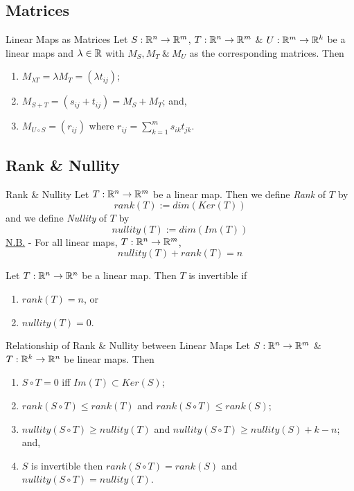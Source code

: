 \documentclass[11pt,a4paper]{article}
\begin{document}
\subsection{Matrices}

\subtitle{Definition 5.09 - }{Linear Maps as Matrices}
Let $S : \mathbb{R}^n \to \mathbb{R}^m$, $T : \mathbb{R}^n \to \mathbb{R}^m$ \& $U : \mathbb{R}^m \to \mathbb{R}^k$ be a linear maps and $\lambda \in \mathbb{R}$ with $M_S, M_T\ \&\ M_U$ as the corresponding matrices. Then
\begin{enumerate}[label=\roman*)]
  \item $M_{\lambda T} = \lambda M_T = (\lambda t_{ij})$;
  \item $M_{S + T} = (s_{ij} + t_{ij}) = M_S + M_T$; and,
  \item $M_{U \circ S} = (r_{ij})$ where $r_{ij} = \sum_{k=1}^m s_{ik}t_{jk}$.
\end{enumerate}

\subsection{Rank \& Nullity}

\subtitle{Defintion 5.10 - }{Rank \& Nullity}
Let $T : \mathbb{R}^n \to \mathbb{R}^m$ be a linear map. Then we define \textit{Rank} of $T$ by $$rank(T) := dim(Ker(T))$$
and we define \textit{Nullity} of $T$ by $$nullity(T) := dim(Im(T))$$
\underline{N.B.} - For all linear maps, $T : \mathbb{R}^n \to \mathbb{R}^m$, $$nullity(T) + rank(T) = n$$

\subtitle{Remark 5.11}{}
Let $T : \mathbb{R}^n \to \mathbb{R}^n$ be a linear map. Then $T$ is invertible if
\begin{enumerate}[label=\roman*)]
  \item $rank(T) = n$, or
  \item $nullity(T) = 0$.
\end{enumerate}

\subtitle{Theorem 5.12 - }{Relationship of Rank \& Nullity between Linear Maps}
Let $S : \mathbb{R}^n \to \mathbb{R}^m$ \& $T : \mathbb{R}^k \to \mathbb{R}^n$ be linear maps. Then
\begin{enumerate}[label=\roman*)]
  \item $S \circ T = 0$ iff $Im(T) \subset Ker(S)$;
  \item $rank(S \circ T) \leq rank(T)$ and $rank(S \circ T) \leq rank(S)$;
  \item $nullity(S \circ T) \geq nullity(T)$ and $nullity(S \circ T) \geq nullity(S) + k - n$; and,
  \item $S$ is invertible then $rank(S \circ T) = rank(S)$ and $nullity(S \circ T) = nullity(T)$.
\end{enumerate}
\end{document}

